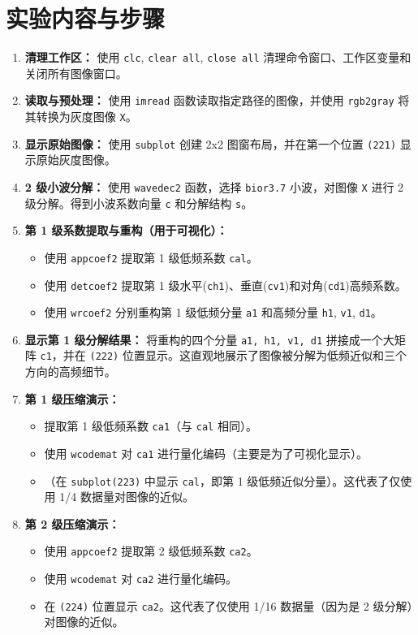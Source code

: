 \documentclass[a4paper]{ctexart}
\begin{document}
	\section{实验内容与步骤}
	\begin{enumerate}
		\item \textbf{清理工作区：} 使用 \texttt{clc}, \texttt{clear all}, \texttt{close all} 清理命令窗口、工作区变量和关闭所有图像窗口。
		\item \textbf{读取与预处理：} 使用 \texttt{imread} 函数读取指定路径的图像，并使用 \texttt{rgb2gray} 将其转换为灰度图像 \texttt{X}。
		\item \textbf{显示原始图像：} 使用 \texttt{subplot} 创建 2x2 图窗布局，并在第一个位置 \texttt{(221)} 显示原始灰度图像。
		\item \textbf{2 级小波分解：} 使用 \texttt{wavedec2} 函数，选择 \texttt{bior3.7} 小波，对图像 \texttt{X} 进行 2 级分解。得到小波系数向量 \texttt{c} 和分解结构 \texttt{s}。
		\item \textbf{第 1 级系数提取与重构（用于可视化）：}
		\begin{itemize}
			\item 使用 \texttt{appcoef2} 提取第 1 级低频系数 \texttt{cal}。
			\item 使用 \texttt{detcoef2} 提取第 1 级水平(\texttt{ch1})、垂直(\texttt{cv1})和对角(\texttt{cd1})高频系数。
			\item 使用 \texttt{wrcoef2} 分别重构第 1 级低频分量 \texttt{a1} 和高频分量 \texttt{h1}, \texttt{v1}, \texttt{d1}。
		\end{itemize}
		\item \textbf{显示第 1 级分解结果：} 将重构的四个分量 \texttt{a1, h1, v1, d1} 拼接成一个大矩阵 \texttt{c1}，并在 \texttt{(222)} 位置显示。这直观地展示了图像被分解为低频近似和三个方向的高频细节。
		\item \textbf{第 1 级压缩演示：}
		\begin{itemize}
			\item 提取第 1 级低频系数 \texttt{ca1}（与 \texttt{cal} 相同）。
			\item 使用 \texttt{wcodemat} 对 \texttt{ca1} 进行量化编码（主要是为了可视化显示）。
			\item （在 \texttt{subplot(223)} 中显示 \texttt{cal}，即第 1 级低频近似分量）。这代表了仅使用 1/4 数据量对图像的近似。
		\end{itemize}
		\item \textbf{第 2 级压缩演示：}
		\begin{itemize}
			\item 使用 \texttt{appcoef2} 提取第 2 级低频系数 \texttt{ca2}。
			\item 使用 \texttt{wcodemat} 对 \texttt{ca2} 进行量化编码。
			\item 在 \texttt{(224)} 位置显示 \texttt{ca2}。这代表了仅使用 1/16 数据量（因为是 2 级分解）对图像的近似。
		\end{itemize}
	\end{enumerate}
	
\end{document}
